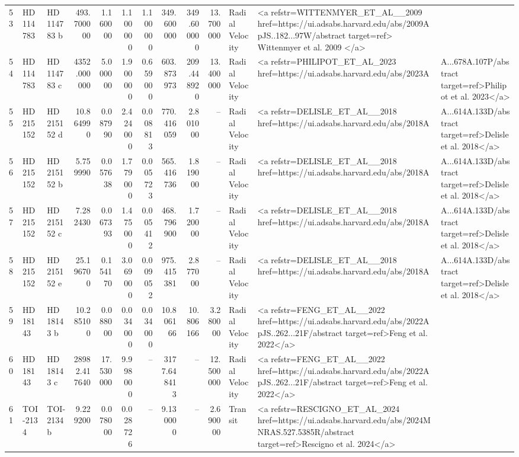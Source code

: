 \begin{tabular}{lllrrrrrrrll}
53 & HD 114783 & HD 114783 b & 493.700000 & 1.160000 & 1.100000 & 1.100000 & 349.600000 & 349.600000 & 13.700000 & Radial Velocity & <a refstr=WITTENMYER_ET_AL__2009 href=https://ui.adsabs.harvard.edu/abs/2009ApJS..182...97W/abstract target=ref> Wittenmyer et al. 2009 </a> \\
54 & HD 114783 & HD 114783 c & 4352.000000 & 5.000000 & 1.900000 & 0.659000 & 603.873973 & 209.448920 & 13.400000 & Radial Velocity & <a refstr=PHILIPOT_ET_AL_2023 href=https://ui.adsabs.harvard.edu/abs/2023A&A...678A.107P/abstract target=ref>Philipot et al. 2023</a> \\
55 & HD 215152 & HD 215152 d & 10.864990 & 0.087990 & 2.424000 & 0.008813 & 770.416059 & 2.801000 & -- & Radial Velocity & <a refstr=DELISLE_ET_AL__2018 href=https://ui.adsabs.harvard.edu/abs/2018A&A...614A.133D/abstract target=ref>Delisle et al. 2018</a> \\
56 & HD 215152 & HD 215152 b & 5.759990 & 0.057638 & 1.779000 & 0.005723 & 565.416736 & 1.819000 & -- & Radial Velocity & <a refstr=DELISLE_ET_AL__2018 href=https://ui.adsabs.harvard.edu/abs/2018A&A...614A.133D/abstract target=ref>Delisle et al. 2018</a> \\
57 & HD 215152 & HD 215152 c & 7.282430 & 0.067393 & 1.475000 & 0.005412 & 468.796900 & 1.720000 & -- & Radial Velocity & <a refstr=DELISLE_ET_AL__2018 href=https://ui.adsabs.harvard.edu/abs/2018A&A...614A.133D/abstract target=ref>Delisle et al. 2018</a> \\
58 & HD 215152 & HD 215152 e & 25.196700 & 0.154170 & 3.069000 & 0.009052 & 975.415381 & 2.877000 & -- & Radial Velocity & <a refstr=DELISLE_ET_AL__2018 href=https://ui.adsabs.harvard.edu/abs/2018A&A...614A.133D/abstract target=ref>Delisle et al. 2018</a> \\
59 & HD 18143 & HD 18143 b & 10.285100 & 0.088000 & 0.034000 & 0.034000 & 10.806166 & 10.806166 & 3.280000 & Radial Velocity & <a refstr=FENG_ET_AL__2022 href=https://ui.adsabs.harvard.edu/abs/2022ApJS..262...21F/abstract target=ref>Feng et al. 2022</a> \\
60 & HD 18143 & HD 18143 c & 28982.417640 & 17.530000 & 9.998000 & -- & 3177.648413 & -- & 12.500000 & Radial Velocity & <a refstr=FENG_ET_AL__2022 href=https://ui.adsabs.harvard.edu/abs/2022ApJS..262...21F/abstract target=ref>Feng et al. 2022</a> \\
61 & TOI-2134 & TOI-2134 b & 9.229200 & 0.078000 & 0.028726 & -- & 9.130000 & -- & 2.690000 & Transit & <a refstr=RESCIGNO_ET_AL_2024 href=https://ui.adsabs.harvard.edu/abs/2024MNRAS.527.5385R/abstract target=ref>Rescigno et al. 2024</a> \\

\end{tabular}
